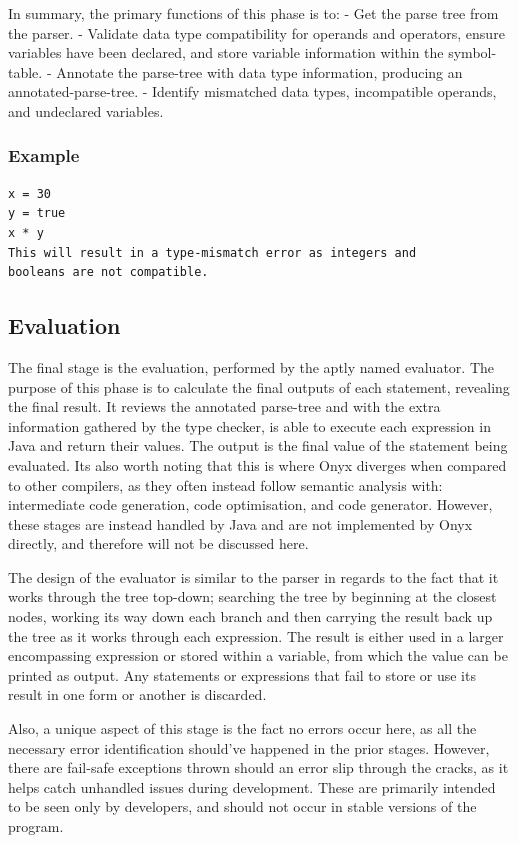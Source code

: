 \documentclass[
]{report}
\begin{document}
In summary, the primary functions of this phase is to: - Get the parse
tree from the parser. - Validate data type compatibility for operands
and operators, ensure variables have been declared, and store variable
information within the \gls{symbol-table}. - Annotate the \gls{parse-tree} with data
type information, producing an \gls{annotated-parse-tree}. - Identify
mismatched data types, incompatible operands, and undeclared variables.

\subsubsection{Example}
\begin{verbatim}
x = 30
y = true
x * y
This will result in a type-mismatch error as integers and 
booleans are not compatible.
\end{verbatim}

\subsection{Evaluation}
The final stage is the evaluation, performed by the aptly named
evaluator. The purpose of this phase is to calculate the final outputs
of each \gls{statement}, revealing the final result. It reviews the annotated
\gls{parse-tree} and with the extra information gathered by the type checker,
is able to execute each \gls{expression} in Java and return their values. The
output is the final value of the \gls{statement} being evaluated. Its also
worth noting that this is where Onyx diverges when compared to other
compilers, as they often instead follow semantic analysis with:
intermediate code generation, code optimisation, and code generator.
However, these stages are instead handled by Java and are not
implemented by Onyx directly, and therefore will not be discussed here.

The design of the evaluator is similar to the parser in regards to the
fact that it works through the tree top-down; searching the tree by
beginning at the closest nodes, working its way down each branch and
then carrying the result back up the tree as it works through each
\gls{expression}. The result is either used in a larger encompassing
\gls{expression} or stored within a variable, from which the value can be
printed as output. Any \glspl{statement} or \glspl{expression} that fail to store or
use its result in one form or another is discarded.

Also, a unique aspect of this stage is the fact no errors occur here, as
all the necessary error identification should've happened in the prior
stages. However, there are fail-safe exceptions thrown should an error
slip through the cracks, as it helps catch unhandled issues during
development. These are primarily intended to be seen only by developers,
and should not occur in stable versions of the program.
\end{document}
